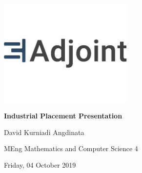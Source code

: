 \documentclass[11pt]{beamer}
\begin{document}
\begin{frame}

\begin{center}

\vspace{-1cm}

\includegraphics[width=0.5\textwidth]{adjoint.png}

\textbf{\Large Industrial Placement Presentation}

\vspace{1cm}

David Kurniadi Angdinata

{\footnotesize MEng Mathematics and Computer Science 4}

{\scriptsize Friday, 04 October 2019}

\end{center}

\end{frame}
\end{document}
